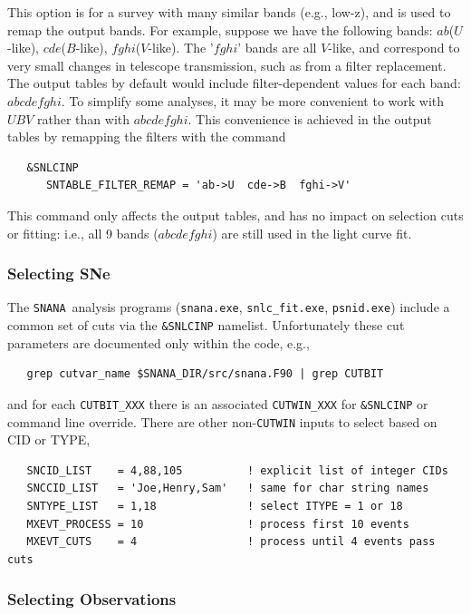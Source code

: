 \documentclass[12pt]{article}
\newcommand{\snana}{{\tt SNANA}}
\begin{document}
This option is for a survey with many similar bands (e.g., low-z),
and is used to remap the output bands. For example, suppose we
have the following bands: 
$ab$($U$-like), $cde$($B$-like), $fghi$($V$-like).
The '$fghi$' bands are all $V$-like, and correspond to very small 
changes in telescope transmission, such as from a filter replacement.
The output tables by default would include filter-dependent
values for each band: $abcdefghi$.  
To simplify some analyses, it may be more convenient to work
with $UBV$ rather than with $abcdefghi$.  
This convenience is achieved in the output tables
by remapping the filters with the command
\begin{verbatim}
   &SNLCINP
      SNTABLE_FILTER_REMAP = 'ab->U  cde->B  fghi->V'
\end{verbatim}
%
This command only affects the output tables, and has
no impact on selection cuts or fitting: 
i.e., all 9 bands ($abcdefghi$) are still
used in the light curve fit. 

  \clearpage
  \subsubsection{Selecting SNe}
  \label{sss:select_SN}

The \snana\ analysis programs 
({\tt snana.exe}, {\tt snlc\_fit.exe}, {\tt psnid.exe})
include a common set of cuts via the {\tt \&SNLCINP} namelist.
Unfortunately these cut parameters are documented only within
the code, e.g.,
\begin{verbatim}                                                               
   grep cutvar_name $SNANA_DIR/src/snana.F90 | grep CUTBIT
\end{verbatim}
and for each {\tt CUTBIT\_XXX} there is an associated 
{\tt CUTWIN\_XXX} for {\tt \&SNLCINP} or command line override.
There are other non-{\tt CUTWIN} inputs to select based on CID or TYPE,
\begin{verbatim}
   SNCID_LIST    = 4,88,105          ! explicit list of integer CIDs
   SNCCID_LIST   = 'Joe,Henry,Sam'   ! same for char string names
   SNTYPE_LIST   = 1,18              ! select ITYPE = 1 or 18
   MXEVT_PROCESS = 10                ! process first 10 events
   MXEVT_CUTS    = 4                 ! process until 4 events pass cuts
\end{verbatim}


  \subsubsection{Selecting Observations}
  \label{sss:select_obs}
\end{document}

